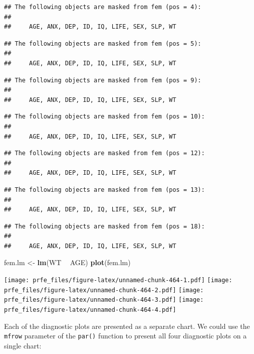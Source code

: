 \documentclass[12pt,a4paper]{book}
\newenvironment{Shaded}{\begin{snugshade}}{\end{snugshade}}
\newcommand{\KeywordTok}[1]{\textcolor[rgb]{0.13,0.29,0.53}{\textbf{#1}}}
\newcommand{\NormalTok}[1]{#1}
\newcommand{\OperatorTok}[1]{\textcolor[rgb]{0.81,0.36,0.00}{\textbf{#1}}}
\newcommand{\StringTok}[1]{\textcolor[rgb]{0.31,0.60,0.02}{#1}}
\theoremstyle{definition}
\theoremstyle{definition}
\theoremstyle{definition}
\theoremstyle{remark}
\begin{document}
\begin{verbatim}
## The following objects are masked from fem (pos = 4):
## 
##     AGE, ANX, DEP, ID, IQ, LIFE, SEX, SLP, WT
\end{verbatim}

\begin{verbatim}
## The following objects are masked from fem (pos = 5):
## 
##     AGE, ANX, DEP, ID, IQ, LIFE, SEX, SLP, WT
\end{verbatim}

\begin{verbatim}
## The following objects are masked from fem (pos = 9):
## 
##     AGE, ANX, DEP, ID, IQ, LIFE, SEX, SLP, WT
\end{verbatim}

\begin{verbatim}
## The following objects are masked from fem (pos = 10):
## 
##     AGE, ANX, DEP, ID, IQ, LIFE, SEX, SLP, WT
\end{verbatim}

\begin{verbatim}
## The following objects are masked from fem (pos = 12):
## 
##     AGE, ANX, DEP, ID, IQ, LIFE, SEX, SLP, WT
\end{verbatim}

\begin{verbatim}
## The following objects are masked from fem (pos = 13):
## 
##     AGE, ANX, DEP, ID, IQ, LIFE, SEX, SLP, WT
\end{verbatim}

\begin{verbatim}
## The following objects are masked from fem (pos = 18):
## 
##     AGE, ANX, DEP, ID, IQ, LIFE, SEX, SLP, WT
\end{verbatim}

\begin{Shaded}
\begin{Highlighting}[]
\NormalTok{fem.lm <-}\StringTok{ }\KeywordTok{lm}\NormalTok{(WT }\OperatorTok{~}\StringTok{ }\NormalTok{AGE)}
\KeywordTok{plot}\NormalTok{(fem.lm)}
\end{Highlighting}
\end{Shaded}

\texttt{[image: prfe\_files/figure-latex/unnamed-chunk-464-1.pdf]}
\texttt{[image: prfe\_files/figure-latex/unnamed-chunk-464-2.pdf]}
\texttt{[image: prfe\_files/figure-latex/unnamed-chunk-464-3.pdf]}
\texttt{[image: prfe\_files/figure-latex/unnamed-chunk-464-4.pdf]}

Each of the diagnostic plots are presented as a separate chart. We could
use the \texttt{mfrow} parameter of the \texttt{par()} function to
present all four diagnostic plots on a single chart:
\end{document}
